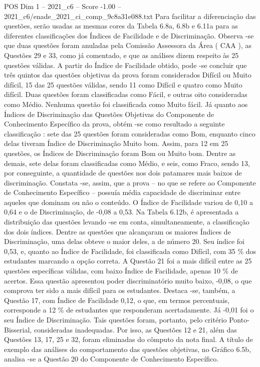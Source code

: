 \begin{textsample}{POS Dim 1 – 2021\_c6 – Score -1.00 – 2021\_c6/enade\_2021\_ci\_comp\_9c8a31e088.txt}
Para facilitar a diferenciação das questões, serão usadas as mesmas cores da Tabela 6.8a, 6.8b e 6.11a para as diferentes classificações dos Índices de Facilidade e de Discriminação.
Observa -se que duas questões foram anuladas pela Comissão Assessora da Área ( CAA ), as Questões 29 e 33, como já comentado, e que as análises dizem respeito às 25 questões válidas.
A partir do Índice de Facilidade obtido, pode -se concluir que três quintos das questões objetivas da prova foram considerados Difícil ou Muito difícil, 15 das 25 questões válidas, sendo 11 como Difícil e quatro como Muito difícil.
Duas questões foram classificadas como Fácil, e outras oito consideradas como Médio.
Nenhuma questão foi classificada como Muito fácil.
Já quanto aos Índices de Discriminação das Questões Objetivas do Componente de Conhecimento Específico da prova, obtém -se como resultado a seguinte classificação : sete das 25 questões foram consideradas como Bom, enquanto cinco delas tiveram Índice de Discriminação Muito bom.
Assim, para 12 em 25 questões, os Índices de Discriminação foram Bom ou Muito bom.
Dentre as demais, sete delas foram classificadas como Médio, e seis, como Fraco, sendo 13, por conseguinte, a quantidade de questões nos dois patamares mais baixos de discriminação.
Constata -se, assim, que a prova – no que se refere ao Componente de Conhecimento Específico – possuía média capacidade de discriminar entre aqueles que dominam ou não o conteúdo.
O Índice de Facilidade variou de 0,10 a 0,64 e o de Discriminação, de -0,08 a 0,53.
Na Tabela 6.12b, é apresentada a distribuição das questões levando -se em conta, simultaneamente, a classificação dos dois índices.
Dentre as questões que alcançaram os maiores Índices de Discriminação, uma delas obteve o maior deles, a de número 20.
Seu índice foi 0,53, e, quanto ao Índice de Facilidade, foi classificada como Difícil, com 35 \% dos estudantes marcando a opção correta.
A Questão 21 foi a mais difícil entre as 25 questões específicas válidas, com baixo Índice de Facilidade, apenas 10 \% de acertos.
Essa questão apresentou poder discriminatório muito baixo, -0,08, o que comprova ter sido a mais difícil para os estudantes.
Destaca -se, também, a Questão 17, com Índice de Facilidade 0,12, o que, em termos percentuais, corresponde a 12 \% de estudantes que responderam acertadamente.
Já -0,01 foi o seu Índice de Discriminação.
Tais questões foram, portanto, pelo critério Ponto-Bisserial, consideradas inadequadas.
Por isso, as Questões 12 e 21, além das Questões 13, 17, 25 e 32, foram eliminadas do cômputo da nota final.
A título de exemplo das análises do comportamento das questões objetivas, no Gráfico 6.5b, analisa -se a Questão 20 do Componente de Conhecimento Específico.

\end{textsample}
